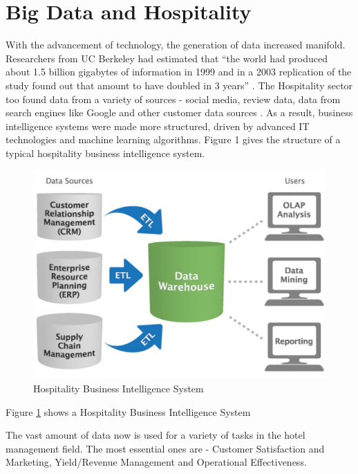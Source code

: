 \documentclass[sigconf]{acmart}
\begin{document}
\section{Big Data and Hospitality}

With the advancement of technology, the generation of data increased manifold. Researchers from UC Berkeley had estimated that ``the world had produced about 1.5 billion gigabytes of information in 1999 and in a 2003 replication of the study found out that amount to have doubled in 3 years'' \cite {gpress04}.
\newline The Hospitality sector too found data from a variety of sources - social media, review data, data from search engines like Google and other customer data sources \cite {bigdatapredictive02}. As a result, business intelligence systems were made more structured, driven by advanced IT technologies and machine learning algorithms. Figure 1 gives the structure of a typical hospitality business intelligence system.

\begin{figure}
	\includegraphics[width=\columnwidth]{images/business_intelligence_system.pdf}
	\caption{Hospitality Business Intelligence System \cite {businessintelligencetools08}}
        \label{F:Figure 1}
\end{figure}
Figure \ref{F:Figure 1} shows a Hospitality Business Intelligence System

The vast amount of data now is used for a variety of tasks in the hotel management field. The most essential ones are - Customer Satisfaction and Marketing, Yield/Revenue Management and Operational Effectiveness.
\end{document}

